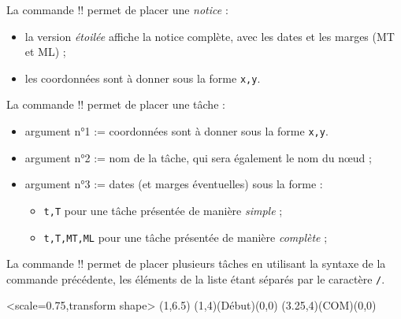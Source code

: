 \documentclass[french,a4paper,11pt]{article}
\begin{document}
{{\begin{tipblock}
La commande \motcletex!\MPMPlaceNotice! permet de placer une \textit{notice} :

\begin{itemize}
	\item la version \textit{étoilée} affiche la notice complète, avec les dates et les marges (MT et ML) ;
	\item les coordonnées sont à donner sous la forme \verb!x,y!.
\end{itemize}
\vspace*{-\baselineskip}\leavevmode
\end{tipblock}

\begin{tipblock}
La commande \motcletex!\MPMPlaceTache! permet de placer une tâche :

\begin{itemize}
	\item argument n°1 := coordonnées sont à donner sous la forme \verb!x,y!.
	\item argument n°2 := nom de la tâche, qui sera également le nom du nœud ;
	\item argument n°3 := dates (et marges éventuelles) sous la forme :
	\begin{itemize}
		\item \verb!t,T! pour une tâche présentée de manière \textit{simple} ;
		\item \verb!t,T,MT,ML! pour une tâche présentée de manière \textit{complète} ;
	\end{itemize}
\end{itemize}
\vspace*{-\baselineskip}\leavevmode
\end{tipblock}

\begin{tipblock}
La commande \motcletex!\MPMPlaceTaches! permet de placer plusieurs tâches en utilisant la syntaxe de la commande précédente, les éléments de la liste étant séparés par le caractère \verb!/!.
\end{tipblock}

\begin{DemoCode}[]
\begin{GrapheMPM}[CouleurDates=green/orange,CouleurBords=brown,Grille={18,8}]%
	<scale=0.75,transform shape>
	\MPMPlaceNotice(1,6.5)
	\MPMPlaceTache(1,4)(Début)(0,0)
	\MPMPlaceTache(3.25,4)(COM)(0,0)
\end{GrapheMPM}
\end{DemoCode}

}}
\end{document}
